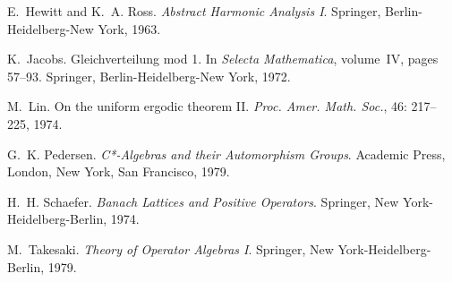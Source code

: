 \begin{thebibliography}{15}
E.~Hewitt and K.~A. Ross.
\newblock \emph{Abstract Harmonic Analysis {I}}.
\newblock Springer, Berlin-Heidelberg-New York, 1963.

K.~Jacobs.
\newblock Gleichverteilung mod 1.
\newblock In \emph{Selecta Mathematica}, volume~IV, pages 57--93. Springer,
  Berlin-Heidelberg-New York, 1972.

M.~Lin.
\newblock On the uniform ergodic theorem {II}.
\newblock \emph{Proc. Amer. Math. Soc.}, 46: 217--225, 1974.

G.~K. Pedersen.
\newblock \emph{{C*}-Algebras and their Automorphism Groups}.
\newblock Academic Press, London, New York, San Francisco, 1979.

H.~H. Schaefer.
\newblock \emph{Banach Lattices and Positive Operators}.
\newblock Springer, New York-Heidelberg-Berlin, 1974.

M.~Takesaki.
\newblock \emph{Theory of Operator Algebras {I}}.
\newblock Springer, New York-Heidelberg-Berlin, 1979.

\end{thebibliography}
